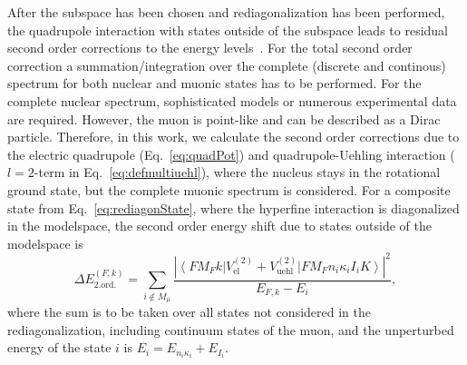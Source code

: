 After the subspace has been chosen and rediagonalization has been performed, the quadrupole interaction with states outside of the subspace leads to residual second order corrections to the energy levels~\cite{chen1970}.
For the total second order correction a summation/integration over the complete (discrete and continous) spectrum for both nuclear and muonic states has to be performed. For the complete nuclear spectrum, sophisticated models or numerous experimental data are required. However, the muon is point-like and can be described as a Dirac particle. Therefore, in this work, we calculate the second order corrections due to the electric quadrupole (Eq.~\eqref{eq:quadPot}) and quadrupole-Uehling interaction (${l}{=}{2}$-term in Eq.~\eqref{eq:defmultiuehl}), where the nucleus stays in the rotational ground state, but the complete muonic spectrum is considered.
For a composite state from Eq.~\eqref{eq:rediagonState}, where the hyperfine interaction is diagonalized in the modelspace, the second order energy shift due to states outside of the modelspace is
\begin{equation}
\Delta E_{\text{2.ord.}}^{(F,k)}= \sum_{i\notin M_{\mu}}\frac{\left|\left< FM_Fk\right|{V_{\text{el}}^{(2)}}{+}{V_{\text{uehl}}^{(2)}}\left|FM_Fn_i\kappa_iI_iK \right>\right|^2}{E_{F,k}-E_i},
\label{eq:second}
\end{equation}
where the sum is to be taken over all states not considered in the rediagonalization, including continuum states of the muon, and the unperturbed energy of the state $i$ is $E_i=E_{n_i\kappa_i}+E_{I_i}$.













